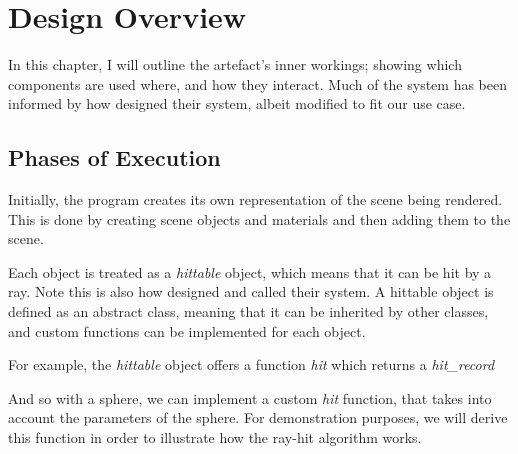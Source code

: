 \documentclass[../main.tex]{subfiles}
\begin{document}
\section{Design Overview}
In this chapter, I will outline the artefact's inner workings; showing which components are used where, and how they interact. 
Much of the system has been informed by how \cite{pharr_physically_2016} designed their system, albeit modified to fit our use case.

\subsection{Phases of Execution}

Initially, the program creates its own representation of the scene being rendered. This is done by creating scene objects and materials
and then adding them to the scene.

Each object is treated as a \textit{hittable} object, which means that it can be hit by a ray. Note this is also how \cite{peter_shirley_trevor_david_black_steve_hollasch_ray_nodate}
designed and called their system. A hittable object is defined as an abstract class, meaning that it can be inherited by other classes, and custom functions can be implemented 
for each object.

For example, the \textit{hittable} object offers a function \textit{hit} which returns a \textit{hit\_record}

And so with a sphere, we can implement a custom \textit{hit} function, that takes into account the parameters of the sphere.
For demonstration purposes, we will derive this function in order to illustrate how the ray-hit algorithm works.
\end{document}
